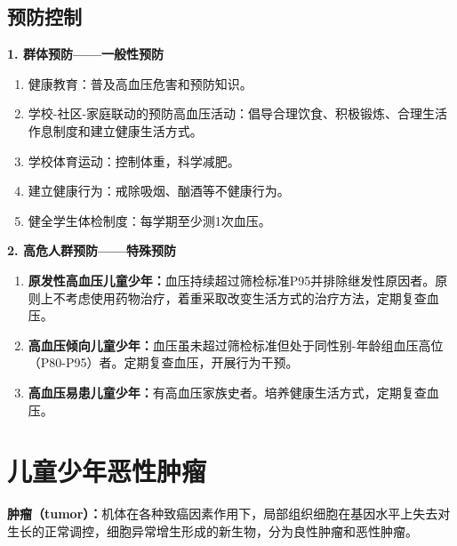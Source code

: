 \subsection{预防控制}

\begin{keybox}
\textbf{1. 群体预防——一般性预防}
\begin{enumerate}[leftmargin=*]
    \item 健康教育：普及高血压危害和预防知识。
    \item 学校-社区-家庭联动的预防高血压活动：倡导合理饮食、积极锻炼、合理生活作息制度和建立健康生活方式。
    \item 学校体育运动：控制体重，科学减肥。
    \item 建立健康行为：戒除吸烟、酗酒等不健康行为。
    \item 健全学生体检制度：每学期至少测1次血压。
\end{enumerate}

\textbf{2. 高危人群预防——特殊预防}
\begin{enumerate}[leftmargin=*]
    \item \textbf{原发性高血压儿童少年：}血压持续超过筛检标准P95并排除继发性原因者。原则上不考虑使用药物治疗，着重采取改变生活方式的治疗方法，定期复查血压。
    \item \textbf{高血压倾向儿童少年：}血压虽未超过筛检标准但处于同性别-年龄组血压高位（P80-P95）者。定期复查血压，开展行为干预。
    \item \textbf{高血压易患儿童少年：}有高血压家族史者。培养健康生活方式，定期复查血压。
\end{enumerate}
\end{keybox}

\section{儿童少年恶性肿瘤}

\begin{defbox}
\textbf{肿瘤（tumor）：}机体在各种致癌因素作用下，局部组织细胞在基因水平上失去对生长的正常调控，细胞异常增生形成的新生物，分为良性肿瘤和恶性肿瘤。
\end{defbox}

